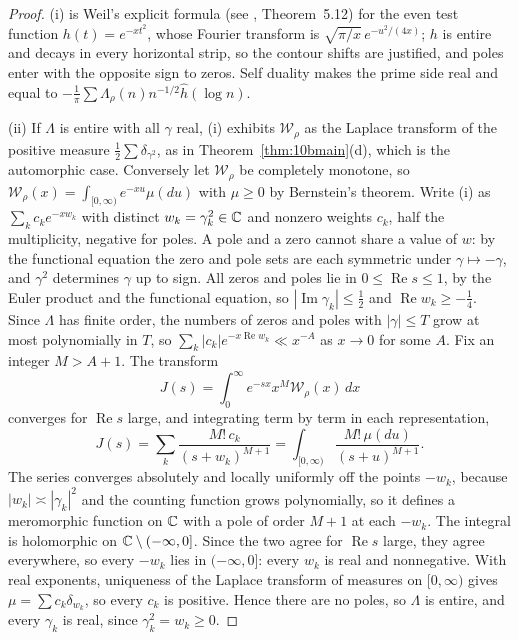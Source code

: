 \begin{proof}
(i) is Weil's explicit formula \cite{weil1952} (see \cite{iwanieckowalski2004}, Theorem~5.12) for the even test function $h(t)=e^{-xt^2}$, whose Fourier transform is $\sqrt{\pi/x}\,e^{-u^2/(4x)}$; $h$ is entire and decays in every horizontal strip, so the contour shifts are justified, and poles enter with the opposite sign to zeros. Self duality makes the prime side real and equal to $-\frac1\pi\sum\Lambda_\rho(n)n^{-1/2}\hat h(\log n)$.

(ii) If $\Lambda$ is entire with all $\gamma$ real, (i) exhibits $\mathcal W_\rho$ as the Laplace transform of the positive measure $\frac12\sum\delta_{\gamma^2}$, as in Theorem~\ref{thm:10bmain}(d), which is the automorphic case. Conversely let $\mathcal W_\rho$ be completely monotone, so $\mathcal W_\rho(x)=\int_{[0,\infty)}e^{-xu}\mu(du)$ with $\mu\ge0$ by Bernstein's theorem. Write (i) as $\sum_kc_ke^{-xw_k}$ with distinct $w_k=\gamma_k^2\in\mathbb{C}$ and nonzero weights $c_k$, half the multiplicity, negative for poles. A pole and a zero cannot share a value of $w$: by the functional equation the zero and pole sets are each symmetric under $\gamma\mapsto-\gamma$, and $\gamma^2$ determines $\gamma$ up to sign. All zeros and poles lie in $0\le\operatorname{Re}s\le1$, by the Euler product and the functional equation, so $|\operatorname{Im}\gamma_k|\le\frac12$ and $\operatorname{Re}w_k\ge-\frac14$. Since $\Lambda$ has finite order, the numbers of zeros and poles with $|\gamma|\le T$ grow at most polynomially in $T$, so $\sum_k|c_k|e^{-x\operatorname{Re}w_k}\ll x^{-A}$ as $x\to0$ for some $A$. Fix an integer $M>A+1$. The transform
\[
J(s)=\int_0^\infty e^{-sx}x^M\mathcal W_\rho(x)\,dx
\]
converges for $\operatorname{Re}s$ large, and integrating term by term in each representation,
\[
J(s)=\sum_k\frac{M!\,c_k}{(s+w_k)^{M+1}}=\int_{[0,\infty)}\frac{M!\,\mu(du)}{(s+u)^{M+1}}.
\]
The series converges absolutely and locally uniformly off the points $-w_k$, because $|w_k|\asymp|\gamma_k|^2$ and the counting function grows polynomially, so it defines a meromorphic function on $\mathbb{C}$ with a pole of order $M+1$ at each $-w_k$. The integral is holomorphic on $\mathbb{C}\setminus(-\infty,0]$. Since the two agree for $\operatorname{Re}s$ large, they agree everywhere, so every $-w_k$ lies in $(-\infty,0]$: every $w_k$ is real and nonnegative. With real exponents, uniqueness of the Laplace transform of measures on $[0,\infty)$ gives $\mu=\sum c_k\delta_{w_k}$, so every $c_k$ is positive. Hence there are no poles, so $\Lambda$ is entire, and every $\gamma_k$ is real, since $\gamma_k^2=w_k\ge0$.
\end{proof}

